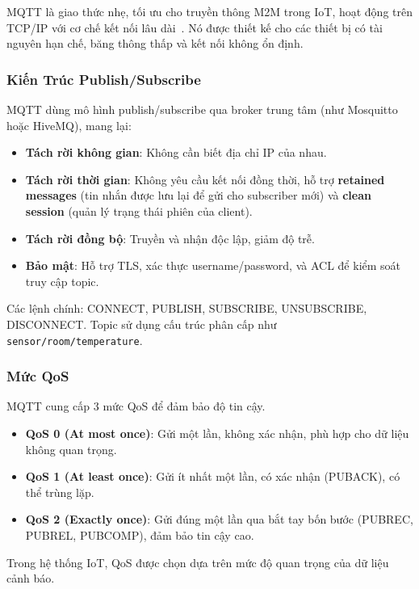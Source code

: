 MQTT là giao thức nhẹ, tối ưu cho truyền thông M2M trong IoT, hoạt động trên TCP/IP với cơ chế kết nối lâu dài~\cite{mqtt_oasis_standard}. Nó được thiết kế cho các thiết bị có tài nguyên hạn chế, băng thông thấp và kết nối không ổn định.

\subsubsection{Kiến Trúc Publish/Subscribe}
\label{subsubsec:mqtt_pubsub}

MQTT dùng mô hình publish/subscribe qua broker trung tâm (như Mosquitto hoặc HiveMQ), mang lại:
\begin{itemize}
\item \textbf{Tách rời không gian}: Không cần biết địa chỉ IP của nhau.
\item \textbf{Tách rời thời gian}: Không yêu cầu kết nối đồng thời, hỗ trợ \textbf{retained messages} (tin nhắn được lưu lại để gửi cho subscriber mới) và \textbf{clean session} (quản lý trạng thái phiên của client).
\item \textbf{Tách rời đồng bộ}: Truyền và nhận độc lập, giảm độ trễ.
\item \textbf{Bảo mật}: Hỗ trợ TLS, xác thực username/password, và ACL để kiểm soát truy cập topic.
\end{itemize}

Các lệnh chính: CONNECT, PUBLISH, SUBSCRIBE, UNSUBSCRIBE, DISCONNECT. Topic sử dụng cấu trúc phân cấp như \texttt{sensor/room/temperature}.

\subsubsection{Mức QoS}
\label{subsubsec:mqtt_qos}

MQTT cung cấp 3 mức QoS để đảm bảo độ tin cậy.

\begin{itemize}
\item \textbf{QoS 0 (At most once)}: Gửi một lần, không xác nhận, phù hợp cho dữ liệu không quan trọng.
\item \textbf{QoS 1 (At least once)}: Gửi ít nhất một lần, có xác nhận (PUBACK), có thể trùng lặp.
\item \textbf{QoS 2 (Exactly once)}: Gửi đúng một lần qua bắt tay bốn bước (PUBREC, PUBREL, PUBCOMP), đảm bảo tin cậy cao.
\end{itemize}

Trong hệ thống IoT, QoS được chọn dựa trên mức độ quan trọng của dữ liệu cảnh báo.

